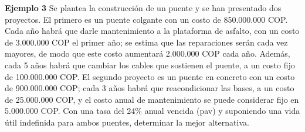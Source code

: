 \textbf{Ejemplo 3}\newline
Se plantea la construcción de un puente y se han presentado dos proyectos. El primero es un puente colgante con un costo de 850.000.000 COP. Cada año habrá que darle mantenimiento a la plataforma de asfalto, con un costo de 3.000.000 COP el primer año; se estima que las reparaciones serán cada vez mayores, de modo que este costo aumentará 2.000.000 COP cada año. Además, cada 5 años habrá que cambiar los cables que sostienen el puente, a un costo fijo de 100.000.000 COP. El segundo proyecto es un puente en concreto con un costo de 900.000.000 COP; cada 3 años habrá que reacondicionar las bases, a un costo de 25.000.000 COP, y el costo anual de mantenimiento se puede considerar fijo en 5.000.000 COP. Con una tasa del 24\% anual vencida (pav) y suponiendo una vida útil indefinida para ambos puentes, determinar la mejor alternativa.


